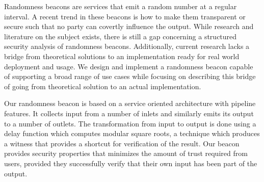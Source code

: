 Randomness beacons are services that emit a random number at a regular interval.
A recent trend in these beacons is how to make them transparent or secure such that no party can covertly influence the output.
While research and literature on the subject exists, there is still a gap concerning a structured security analysis of randomness beacons.
Additionally, current research lacks a bridge from theoretical solutions to an implementation ready for real world deployment and usage.
We design and implement a randomness beacon capable of supporting a broad range of use cases while focusing on describing this bridge of going from theoretical solution to an actual implementation.%

Our randomness beacon is based on a service oriented architecture with pipeline features.
It collects input from a number of inlets and similarly emits its output to a number of outlets.
The transformation from input to output is done using a delay function which computes modular square roots, a technique which produces a witness that provides a shortcut for verification of the result.
Our beacon provides security properties that minimizes the amount of trust required from users, provided they successfully verify that their own input has been part of the output.

